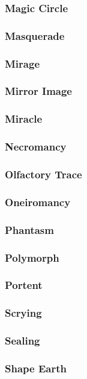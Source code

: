 \begin{multicols}{3}
\subsubsection*{Magic Circle}
\subsubsection*{Masquerade}
\subsubsection*{Mirage}
\subsubsection*{Mirror Image}
\subsubsection*{Miracle}
\subsubsection*{Necromancy}
\subsubsection*{Olfactory Trace}
\subsubsection*{Oneiromancy}
\subsubsection*{Phantasm}
\subsubsection*{Polymorph}
\subsubsection*{Portent}
\subsubsection*{Scrying}
\subsubsection*{Sealing}
\subsubsection*{Shape Earth}

\end{multicols}

